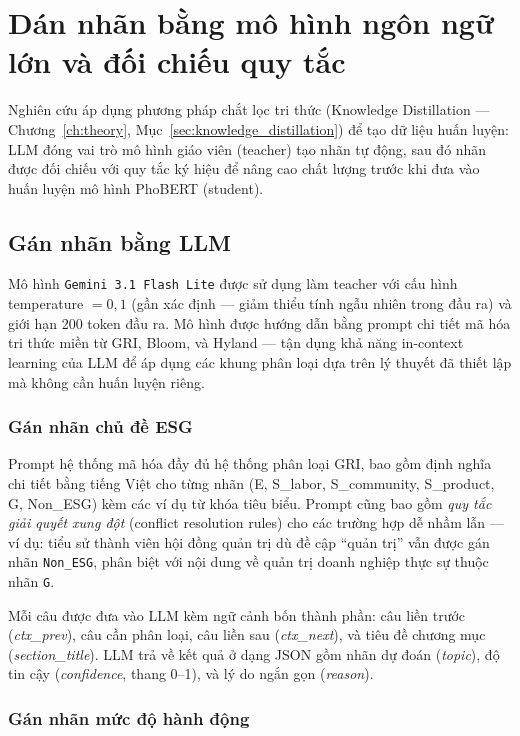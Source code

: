\section{Dán nhãn bằng mô hình ngôn ngữ lớn và đối chiếu quy tắc}
\label{sec:labeling}

Nghiên cứu áp dụng phương pháp chắt lọc tri thức (Knowledge Distillation --- Chương~\ref{ch:theory}, Mục~\ref{sec:knowledge_distillation}) để tạo dữ liệu huấn luyện: LLM đóng vai trò mô hình giáo viên (teacher) tạo nhãn tự động, sau đó nhãn được đối chiếu với quy tắc ký hiệu để nâng cao chất lượng trước khi đưa vào huấn luyện mô hình PhoBERT (student).


\subsection{Gán nhãn bằng LLM}
\label{subsec:llm_labeling}

Mô hình \texttt{Gemini 3.1 Flash Lite} được sử dụng làm teacher với cấu hình temperature $= 0{,}1$ (gần xác định --- giảm thiểu tính ngẫu nhiên trong đầu ra) và giới hạn 200 token đầu ra. Mô hình được hướng dẫn bằng prompt chi tiết mã hóa tri thức miền từ GRI, Bloom, và Hyland --- tận dụng khả năng in-context learning của LLM để áp dụng các khung phân loại dựa trên lý thuyết đã thiết lập mà không cần huấn luyện riêng.

\subsubsection{Gán nhãn chủ đề ESG}

Prompt hệ thống mã hóa đầy đủ hệ thống phân loại GRI, bao gồm định nghĩa chi tiết bằng tiếng Việt cho từng nhãn (E, S\_labor, S\_community, S\_product, G, Non\_ESG) kèm các ví dụ từ khóa tiêu biểu. Prompt cũng bao gồm \textit{quy tắc giải quyết xung đột} (conflict resolution rules) cho các trường hợp dễ nhầm lẫn --- ví dụ: tiểu sử thành viên hội đồng quản trị dù đề cập ``quản trị'' vẫn được gán nhãn \texttt{Non\_ESG}, phân biệt với nội dung về quản trị doanh nghiệp thực sự thuộc nhãn \texttt{G}.

Mỗi câu được đưa vào LLM kèm ngữ cảnh bốn thành phần: câu liền trước (\textit{ctx\_prev}), câu cần phân loại, câu liền sau (\textit{ctx\_next}), và tiêu đề chương mục (\textit{section\_title}). LLM trả về kết quả ở dạng JSON gồm nhãn dự đoán (\textit{topic}), độ tin cậy (\textit{confidence}, thang 0--1), và lý do ngắn gọn (\textit{reason}).

\subsubsection{Gán nhãn mức độ hành động}

